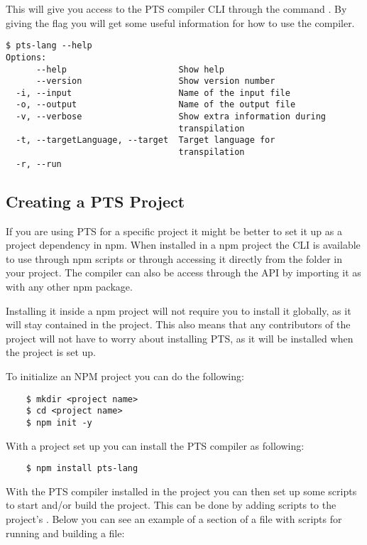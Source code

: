This will give you access to the PTS compiler CLI through the command .
By giving the  flag you will get some useful information for how to use the compiler.

\begin{verbatim}
$ pts-lang --help
Options:
      --help                      Show help
      --version                   Show version number
  -i, --input                     Name of the input file
  -o, --output                    Name of the output file
  -v, --verbose                   Show extra information during
                                  transpilation
  -t, --targetLanguage, --target  Target language for
                                  transpilation
  -r, --run
\end{verbatim}

\subsection{Creating a PTS Project}\label{subsec:creating-a-pts-project}

If you are using PTS for a specific project it might be better to set it up as a project dependency in npm.
When installed in a npm project the CLI is available to use through npm scripts or through accessing it directly from the  folder in your project.
The compiler can also be access through the API by importing it as with any other npm package.

Installing it inside a npm project will not require you to install it globally, as it will stay contained in the project.
This also means that any contributors of the project will not have to worry about installing PTS, as it will be installed when the project is set up.

To initialize an NPM project you can do the following:

\begin{verbatim}
    $ mkdir <project name>
    $ cd <project name>
    $ npm init -y
\end{verbatim}

With a project set up you can install the PTS compiler as following:

\begin{verbatim}
    $ npm install pts-lang
\end{verbatim}

With the PTS compiler installed in the project you can then set up some scripts to start and/or build the project.
This can be done by adding scripts to the project's .
Below you can see an example of a section of a  file with scripts for running and building a file:

